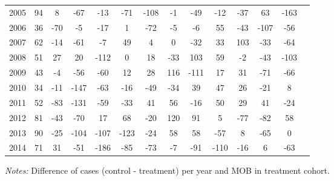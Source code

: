 \begin{table}[H]
\begin{threeparttable}
{\begin{tabular}{l*{13}{c}}
2005        &          94&           8&         -67&         -13&         -71&        -108&          -1&         -49&         -12&         -37&          63&        -163\\
2006        &          36&         -70&          -5&         -17&           1&         -72&          -5&          -6&          55&         -43&        -107&         -56\\
2007        &          62&         -14&         -61&          -7&          49&           4&           0&         -32&          33&         103&         -33&         -64\\
2008        &          51&          27&          20&        -112&           0&          18&         -33&         103&          59&          -2&         -43&        -103\\
2009        &          43&          -4&         -56&         -60&          12&          28&         116&        -111&          17&          31&         -71&         -66\\
2010        &          34&         -11&        -147&         -63&         -16&         -49&         -34&          39&          47&          26&         -21&           8\\
2011        &          52&         -83&        -131&         -59&         -33&          41&          56&         -16&          50&          29&          41&         -24\\
2012        &          81&         -43&         -70&          17&          68&         -20&         120&          91&           5&         -77&         -82&          58\\
2013        &          90&         -25&        -104&        -107&        -123&         -24&          58&          58&         -57&           8&         -65&           0\\
2014        &          71&          31&         -51&        -186&         -85&         -73&          -7&         -91&        -110&         -16&           6&         -63\\
 \bottomrule \end{tabular} } \begin{tablenotes} \item \scriptsize \emph{Notes:} Difference of cases (control - treatment) per year and MOB in treatment cohort. \end{tablenotes} \end{threeparttable} \end{table} 
